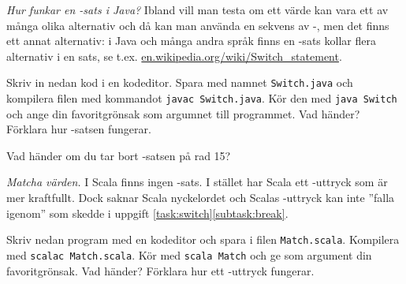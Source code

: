 

\Exercise{\ExeWeekEIGHT}

\begin{Goals}
\item 
\end{Goals}

\begin{Preparations}
\item 
\end{Preparations}

\BasicTasks %

\Task \label{task:switch} \emph{Hur funkar en -sats i Java?} Ibland vill man testa om ett värde kan vara ett av många  olika alternativ och då kan man använda en sekvens av -, men det finns ett annat alternativ: i Java och många andra språk finns en -sats kollar flera alternativ i en sats, se t.ex. \href{https://en.wikipedia.org/wiki/Switch_statement}{en.wikipedia.org/wiki/Switch\_statement}.

\Subtask Skriv in nedan kod i en kodeditor. Spara med namnet \texttt{Switch.java} och kompilera filen med kommandot \texttt{javac Switch.java}. Kör den med \texttt{java Switch} och ange din favoritgrönsak som argumnet till programmet. Vad händer? Förklara hur -satsen fungerar.


\Subtask \label{subtask:break} Vad händer om du tar bort -satsen på rad 15?



\Task \emph{Matcha värden.} I Scala finns ingen -sats. I stället har Scala ett -uttryck som är mer kraftfullt. Dock saknar Scala nyckelordet  och Scalas -uttryck kan inte ''falla igenom'' som skedde i uppgift \ref{task:switch}\ref{subtask:break}.

\Subtask Skriv nedan program med en kodeditor och spara i filen \texttt{Match.scala}. Kompilera med \texttt{scalac Match.scala}. Kör med \texttt{scala Match} och ge som argument din favoritgrönsak. Vad händer? Förklara hur ett -uttryck fungerar.



